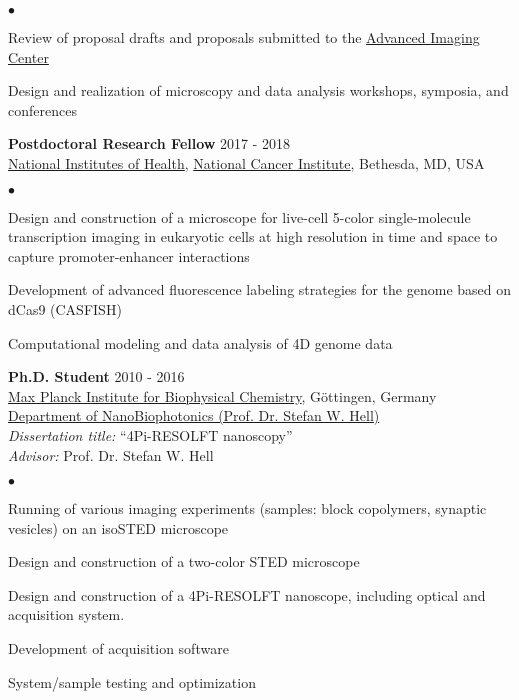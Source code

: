 \documentclass[margin,line]{res}
\newenvironment{list2}{
  \begin{list}{$\bullet$}{%
      \setlength{\itemsep}{0in}
      \setlength{\parsep}{0in} \setlength{\parskip}{0in}
      \setlength{\topsep}{0in} \setlength{\partopsep}{0in} 
      \setlength{\leftmargin}{0.2in}}}{\end{list}}
\begin{document}
\begin{resume}
\begin{list2}
\item Review of proposal drafts and proposals submitted to the \href{https://www.aicjanelia.org/}{Advanced Imaging Center}
\item Design and realization of microscopy and data analysis workshops, symposia, and conferences
\end{list2}
{\bf Postdoctoral Research Fellow} \hfill {2017 - 2018}\\
\href{https://www.nih.gov/}{National Institutes of Health}, \href{https://www.cancer.gov/}{National Cancer Institute}, Bethesda, MD, USA\\
\vspace*{-2mm}
\begin{list2}
\vspace*{-1mm}
\item Design and construction of a microscope for live-cell 5-color single-molecule transcription imaging in eukaryotic cells at high resolution in time and space to capture promoter-enhancer interactions 
\item Development of advanced fluorescence labeling strategies for the genome based on dCas9 (CASFISH)
\item Computational modeling and data analysis of 4D genome data
\end{list2}
{\bf Ph.D. Student} \hfill {2010 - 2016}\\
\href{https://www.mpibpc.mpg.de/en}{Max Planck Institute for Biophysical Chemistry}, Göttingen, Germany\\
\href{http://www.4pi.de/}{Department of NanoBiophotonics (Prof. Dr. Stefan W. Hell)}\\
{\it Dissertation title:} “4Pi-RESOLFT nanoscopy”\\
{\it Advisor:} Prof. Dr. Stefan W. Hell\\
\vspace*{-2mm}
\begin{list2}
\vspace*{-1mm}
\item Running of various imaging experiments (samples: block copolymers, synaptic vesicles) on an isoSTED microscope
\item Design and construction of a two-color STED microscope
\item Design and construction of a 4Pi-RESOLFT nanoscope, including optical and acquisition system.
\item Development of acquisition software
\item System/sample testing and optimization
\end{list2}

\end{resume}
\end{document}
